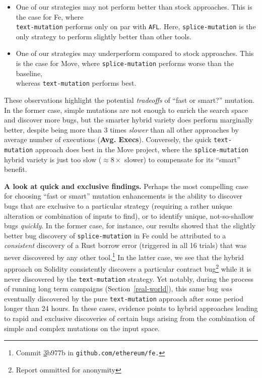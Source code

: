 \begin{itemize}
\item One of our strategies may not perform better than stock approaches. This is the case for Fe, where \\ \texttt{text-mutation} performs only on par with \texttt{AFL}. Here, \texttt{splice-mutation} is the only strategy to perform slightly better than other tools.
\item One of our strategies may underperform compared to stock approaches. This is the case for Move, where \texttt{splice-mutation} performs worse than the baseline, \\ whereas \texttt{text-mutation} performs best.
\end{itemize}

\begin{sloppypar}
These observations highlight the potential \emph{tradeoffs} of ``fast or
smart?'' mutation. In the former case, simple mutations are not enough to
enrich the search space and discover more bugs, but the smarter hybrid variety
does perform marginally better, despite being more than 3 times \emph{slower}
than all other approaches by average number of executions (\textbf{Avg.
Execs}). Conversely, the quick \texttt{text-mutation} approach does best in the
Move project, where the \texttt{splice-mutation} hybrid variety is just too
slow ($\approx8\times$ slower) to compensate for its ``smart''
benefit.
\end{sloppypar}

\textbf{A look at quick and exclusive findings.} Perhaps the most compelling
case for choosing ``fast or smart'' mutation enhancements is the ability to
discover bugs that are exclusive to a particular strategy (requiring a rather
unique alteration or combination of inputs to find), or to identify unique,
not-so-shallow bugs \emph{quickly}. In the former case, for instance, our results
showed that the slightly better bug discovery of \texttt{splice-mutation} in Fe
could be attributed to a \emph{consistent} discovery of a Rust borrow error
(triggered in all 16 trials) that was never discovered by any other
tool.\footnote{Commit
\href{https://github.com/ethereum/fe/commit/3b977b3078eb163ba521f57d8509e16efdb9dbf4}
3b977b in \texttt{github.com/ethereum/fe.}} In the latter case, we see that the
hybrid approach on Solidity consistently discovers a particular contract
bug\footnote{Report ommitted for anonymity} while it is never discovered by the
\texttt{text-mutation} strategy. Yet notably, during the process of running long
term campaigns (Section~\ref{real-world}), this same bug \emph{was} eventually discovered by the pure
\texttt{text-mutation} approach after some period longer than 24 hours. In
these cases, evidence points to hybrid approaches leading to rapid and
exclusive discoveries of certain bugs arising from 
the combination of simple and complex mutations on the input space.

